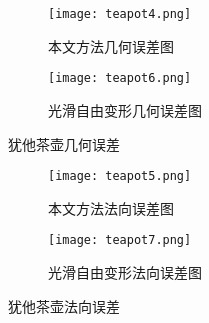 \begin{figure}[htbp]
	\centering
	\begin{subfigure}[b]{.45\textwidth}
		\centering
		\texttt{[image: teapot4.png]}
		\caption{本文方法几何误差图}\label{subfig:teapot4}
	\end{subfigure}%
	\begin{subfigure}[b]{.45\textwidth}
		\centering
		\texttt{[image: teapot6.png]}
		\caption{光滑自由变形几何误差图}\label{subfig:teapot6}
	\end{subfigure}
	\caption{犹他茶壶几何误差}\label{fig:teapot_error0}
\end{figure}
\begin{figure}[htbp]
	\centering
	\begin{subfigure}[b]{.45\textwidth}
		\centering
		\texttt{[image: teapot5.png]}
		\caption{本文方法法向误差图}\label{subfig:teapot5}
	\end{subfigure}%
	\begin{subfigure}[b]{.45\textwidth}
		\centering
		\texttt{[image: teapot7.png]}
		\caption{光滑自由变形法向误差图}\label{subfig:teapot7}
	\end{subfigure}
	\caption{犹他茶壶法向误差}\label{fig:teapot_error1}
\end{figure}
